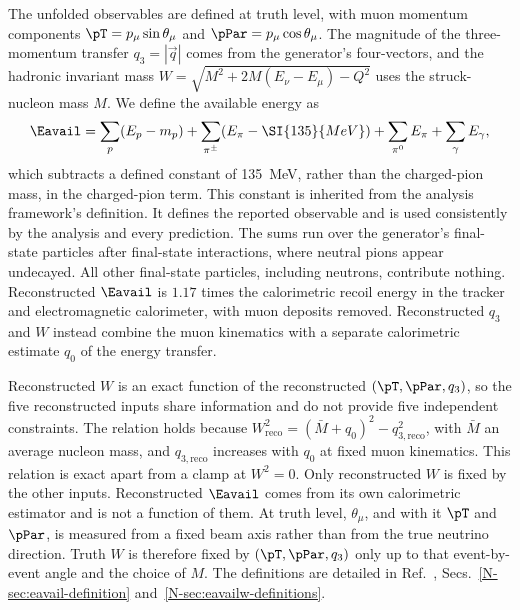 The unfolded observables are defined at truth level, with muon momentum components $\pT=p_{\mu}\sin\theta_{\mu}$
and $\pPar=p_{\mu}\cos\theta_{\mu}$.
The magnitude of the three-momentum transfer $q_{3}=|\vec{q}|$ comes from the generator's four-vectors, and the
hadronic invariant mass $W=\sqrt{M^{2}+2M(E_{\nu}-E_{\mu})-Q^{2}}$ uses the struck-nucleon mass $M$.
We define the available energy as
\begin{equation}
\Eavail=\sum_{p}(E_{p}-m_{p})+\sum_{\pi^{\pm}}(E_{\pi}-\SI{135}{MeV})
+\sum_{\pi^{0}}E_{\pi}+\sum_{\gamma}E_{\gamma},
\label{eq:eavail}
\end{equation}
which subtracts a defined constant of \SI{135}{MeV}, rather than the charged-pion mass, in the charged-pion term.
This constant is inherited from the analysis framework's definition.
It defines the reported observable and is used consistently by the analysis and every prediction.
The sums run over the generator's final-state particles after final-state interactions, where neutral pions appear
undecayed.
All other final-state particles, including neutrons, contribute nothing.
Reconstructed $\Eavail$ is $1.17$ times the calorimetric recoil energy in the tracker and electromagnetic
calorimeter, with muon deposits removed.
Reconstructed $q_{3}$ and $W$ instead combine the muon kinematics with a separate calorimetric estimate $q_{0}$ of
the energy transfer.

Reconstructed $W$ is an exact function of the reconstructed $(\pT,\pPar,q_{3})$, so the five reconstructed inputs
share information and do not provide five independent constraints.
The relation holds because $W_{\mathrm{reco}}^{2}=(\bar M+q_{0})^{2}-q_{3,\mathrm{reco}}^{2}$, with $\bar M$ an
average nucleon mass, and $q_{3,\mathrm{reco}}$ increases with $q_{0}$ at fixed muon kinematics.
This relation is exact apart from a clamp at $W^{2}=0$.
Only reconstructed $W$ is fixed by the other inputs.
Reconstructed $\Eavail$ comes from its own calorimetric estimator and is not a function of them.
At truth level, $\theta_{\mu}$, and with it $\pT$ and $\pPar$, is measured from a fixed beam axis rather than from
the true neutrino direction.
Truth $W$ is therefore fixed by $(\pT,\pPar,q_{3})$ only up to that event-by-event angle and the choice of $M$.
The definitions are detailed in Ref.~\cite{AnalysisNote2026}, Secs.~\ref*{N-sec:eavail-definition}
and~\ref*{N-sec:eavailw-definitions}.

